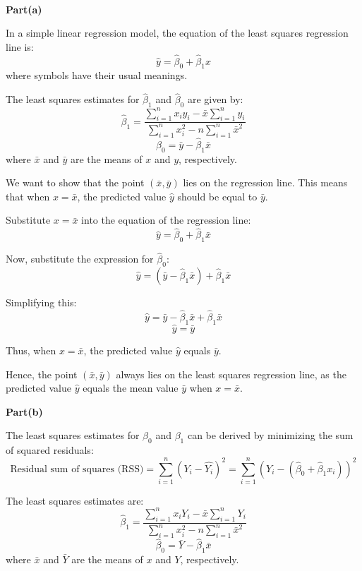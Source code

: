 \documentclass[a4paper,12pt,answers]{exam}
\begin{document}
\begin{questions}
\\
\textbf{Part(a)}\\
\begin{solution}
    In a simple linear regression model, the equation of the least squares regression line is:
\[
\hat{y} = \hat{\beta}_0 + \hat{\beta}_1 x
\]
where symbols have their usual meanings.

The least squares estimates for $\hat{\beta}_1$ and $\hat{\beta}_0$ are given by:
\[
\hat{\beta}_1 = \frac{\sum_{i=1}^{n} x_i y_i-\bar{x}\sum_{i=1}^{n}y_i}{\sum_{i=1}^{n} x_i^{2} - n\sum_{i=1}^{n}\bar{x}^2}
\]
\[
\hat{\beta}_0 = \bar{y} - \hat{\beta}_1 \bar{x}
\]
where $\bar{x}$ and $\bar{y}$ are the means of $x$ and $y$, respectively.

We want to show that the point $(\bar{x}, \bar{y})$ lies on the regression line. This means that when $x = \bar{x}$, the predicted value $\hat{y}$ should be equal to $\bar{y}$.

Substitute $x = \bar{x}$ into the equation of the regression line:
\[
\hat{y} = \hat{\beta}_0 + \hat{\beta}_1 \bar{x}
\]

Now, substitute the expression for $\hat{\beta}_0$:
\[
\hat{y} = \left( \bar{y} - \hat{\beta}_1 \bar{x} \right) + \hat{\beta}_1 \bar{x}
\]

Simplifying this:
\[
\hat{y} = \bar{y} - \hat{\beta}_1 \bar{x} + \hat{\beta}_1 \bar{x}
\]
\[
\hat{y} = \bar{y}
\]

Thus, when $x = \bar{x}$, the predicted value $\hat{y}$ equals $\bar{y}$.

Hence, the point $(\bar{x}, \bar{y})$ always lies on the least squares regression line, as the predicted value $\hat{y}$ equals the mean value $\bar{y}$ when $x = \bar{x}$.
\end{solution}
\textbf{Part(b)}\\
\begin{solution}
    The least squares estimates for $\beta_0$ and $\beta_1$ can be derived by minimizing the sum of squared residuals:
\[
\text{Residual sum of squares (RSS)} = \sum_{i=1}^{n} (Y_i - \hat{Y_i})^2 = \sum_{i=1}^{n} (Y_i - (\hat{\beta}_0 + \hat{\beta}_1 x_i))^2
\]

The least squares estimates are:
\[
\hat{\beta}_1 = \frac{\sum_{i=1}^{n} x_i Y_i-\bar{x}\sum_{i=1}^{n}Y_i}{\sum_{i=1}^{n} x_i^{2} - n\sum_{i=1}^{n}\bar{x}^2}
\]
\[
\hat{\beta}_0 = \bar{Y} - \hat{\beta}_1 \bar{x}
\]
where $\bar{x}$ and $\bar{Y}$ are the means of $x$ and $Y$, respectively.


\end{solution}
\end{questions}
\end{document}
